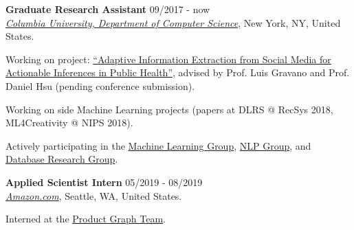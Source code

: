 \documentclass[letterpaper]{article}
\renewenvironment{itemize}{
  \begin{list}{}{
    \setlength{\leftmargin}{1.5em}
  }
}{
  \end{list}
}
\begin{document}
\begin{itemize}
\item 
    \textbf{Graduate Research Assistant} \hfill 09/2017 - now\\ 
    \href{https://www.cs.columbia.edu/}{\it Columbia University, Department of Computer Science}, New York, NY, United States.
    \begin{itemize}
        \item[-] Working on project: \href{http://publichealth.cs.columbia.edu/}{``Adaptive Information Extraction from Social Media for Actionable Inferences in Public Health''}, advised by Prof. Luis Gravano and Prof. Daniel Hsu (pending conference submission).
        \item[-] Working on side Machine Learning projects (papers at DLRS @ RecSys 2018, ML4Creativity @ NIPS 2018).
        \item[-] Actively participating in the \href{http://www.cs.columbia.edu/areas/machine/}{Machine Learning Group}, \href{http://www.cs.columbia.edu/nlp/index.cgi}{NLP Group}, and \href{https://cudbg.github.io/}{Database Research Group}.
    \end{itemize}
\item 
    \textbf{Applied Scientist Intern} \hfill 05/2019 - 08/2019\\ 
    \href{amazon.com}{\it Amazon.com}, Seattle, WA, United States.
    \begin{itemize}
        \item[-] Interned at the \href{https://blog.aboutamazon.com/innovation/making-search-easier}{Product Graph Team}.
    \end{itemize}  


\end{itemize}
\end{document}
